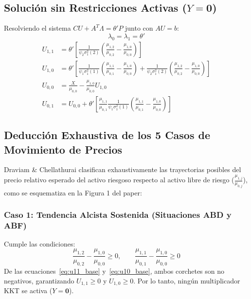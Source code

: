 \documentclass[11pt,a4paper]{report}
\numberwithin{equation}{chapter}
\begin{document}
\subsection{Solución sin Restricciones Activas ($Y = \mathbf{0}$)}
Resolviendo el sistema $CU + A^T \Lambda = \theta' P$ junto con $AU = b$:
\begin{equation}
    \lambda_0 = \lambda_1 = \theta'
\end{equation}
\begin{align}
    U_{1,1} &= \theta' \left[ \frac{1}{\psi_2 \sigma_1^2(2)} \left( \frac{\mu_{1,2}}{\mu_{0,2}} - \frac{\mu_{1,0}}{\mu_{0,0}} \right) \right] \label{eq:u11_base} \\
    U_{1,0} &= \theta' \left[ \frac{1}{\psi_1 \sigma_1^2(1)} \left( \frac{\mu_{1,1}}{\mu_{0,1}} - \frac{\mu_{1,0}}{\mu_{0,0}} \right) + \frac{1}{\psi_2 \sigma_1^2(2)} \left( \frac{\mu_{1,2}}{\mu_{0,2}} - \frac{\mu_{1,0}}{\mu_{0,0}} \right) \right] \label{eq:u10_base} \\
    U_{0,0} &= \frac{X}{\mu_{0,0}} - \frac{\mu_{1,0}}{\mu_{0,0}} U_{1,0} \label{eq:u00_base} \\
    U_{0,1} &= U_{0,0} + \theta' \left[ \frac{\mu_{1,1}}{\mu_{0,1}} \frac{1}{\psi_1 \sigma_1^2(1)} \left( \frac{\mu_{1,1}}{\mu_{0,1}} - \frac{\mu_{1,0}}{\mu_{0,0}} \right) \right] \label{eq:u01_base}
\end{align}

\subsection{Deducción Exhaustiva de los 5 Casos de Movimiento de Precios}

Draviam \& Chellathurai clasifican exhaustivamente las trayectorias posibles del precio relativo esperado del activo riesgoso respecto al activo libre de riesgo ($\frac{\mu_{1,j}}{\mu_{0,j}}$), como se esquematiza en la Figura 1 del paper:

\subsubsection{Caso 1: Tendencia Alcista Sostenida (Situaciones ABD y ABF)}
Cumple las condiciones:
\begin{equation}
    \frac{\mu_{1,2}}{\mu_{0,2}} - \frac{\mu_{1,0}}{\mu_{0,0}} \ge 0, \qquad \frac{\mu_{1,1}}{\mu_{0,1}} - \frac{\mu_{1,0}}{\mu_{0,0}} \ge 0
\end{equation}
De las ecuaciones~\eqref{eq:u11_base} y~\eqref{eq:u10_base}, ambos corchetes son no negativos, garantizando $U_{1,1} \ge 0$ y $U_{1,0} \ge 0$. Por lo tanto, ningún multiplicador KKT se activa ($Y = \mathbf{0}$). 
\end{document}
